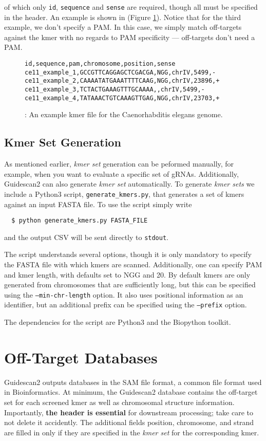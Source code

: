 \documentclass[11pt]{article}
\begin{document}
of which only \texttt{id}, \texttt{sequence} and \texttt{sense} are
required, though all must be specified in the header. An example is
shown in (Figure \ref{fig:kmer_set}). Notice that for the third
example, we don't specify a PAM. In this case, we simply match
off-targets against the kmer with no regards to PAM specificity ---
off-targets don't need a PAM.

\begin{figure}[ht]
  \centering
  \begin{verbatim}
id,sequence,pam,chromosome,position,sense
ce11_example_1,GCCGTTCAGGAGCTCGACGA,NGG,chrIV,5499,-
ce11_example_2,CAAAATATGAAATTTTCAAG,NGG,chrIV,23896,+
ce11_example_3,TCTACTGAAAGTTTGCAAAA,,chrIV,5499,-
ce11_example_4,TATAAACTGTCAAAGTTGAG,NGG,chrIV,23703,+
  \end{verbatim}
  \caption{\label{fig:kmer_set}: An example kmer file for the
    Caenorhabditis elegans genome.}
\end{figure}

\subsection{Kmer Set Generation}
As mentioned earlier, {\it kmer set} generation can be peformed manually,
for example, when you want to evaluate a specific set of gRNAs.
Additionally, Guidescan2 can also generate {\it kmer set} automatically.
To generate {\it kmer sets} we include a Python3 script,
\texttt{generate\_kmers.py}, that generates a set of kmers against an
input FASTA file. To use the script simply write
\begin{verbatim}
  $ python generate_kmers.py FASTA_FILE 
\end{verbatim}
and the output CSV will be sent directly to \texttt{stdout}.

The script understands several options, though it is only mandatory to
specify the FASTA file with which kmers are scanned. Additionally, one
can specify PAM and kmer length, with defaults set to NGG and 20. By
default kmers are only generated from chromosomes that are
sufficiently long, but this can be specified using the
\texttt{--min-chr-length} option. It also uses positional information
as an identifier, but an additional prefix can be specified using the
\texttt{--prefix} option.

The dependencies for the script are Python3 and the Biopython toolkit.

\section{Off-Target Databases}
Guidescan2 outputs databases in the SAM file format, a common file
format used in Bioinformatics. At minimum, the Guidescan2 database
contains the off-target set for each screened kmer as well as
chromosomal structure information. Importantly, \textbf{the header is
  essential} for downstream processing; take care to not delete it
accidently. The additional fields position, chromosome, and strand are
filled in only if they are specified in the {\it kmer set} for the
corresponding kmer. 
\end{document}
